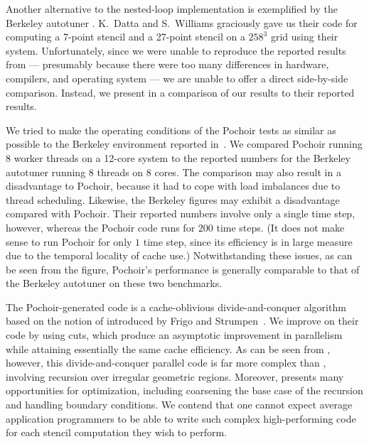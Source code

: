 Another alternative to the nested-loop implementation is exemplified
by the Berkeley autotuner \cite{Datta09,KamilShDa06,WilliamsCaOl08}.
K.~Datta and S.~Williams graciously gave us their code for computing a
7-point stencil and a 27-point stencil on a $258^3$ grid using their
system.  Unfortunately, since we were unable to reproduce the reported
results from \cite{Datta09} --- presumably because there were too many
differences in hardware, compilers, and operating system --- we are
unable to offer a direct side-by-side comparison.  Instead, we present
in  a comparison of our results to their reported
results.

We tried to make the operating conditions of the Pochoir tests as
similar as possible to the Berkeley environment reported
in~\cite{Datta09}.  We compared Pochoir running 8 worker threads on a
12-core system to the reported numbers for the Berkeley autotuner
running 8 threads on 8 cores.  The comparison may also result in a
disadvantage to Pochoir, because it had to cope with load imbalances
due to thread scheduling.  Likewise, the Berkeley figures may exhibit
a disadvantage compared with Pochoir.  Their reported numbers involve
only a single time step, however, whereas the Pochoir code runs for
$200$ time steps.  (It does not make sense to run Pochoir for only $1$
time step, since its efficiency is in large measure due to the
temporal locality of cache use.)  Notwithstanding these issues, as can
be seen from the figure, Pochoir's performance is generally comparable
to that of the Berkeley autotuner on these two benchmarks.

The Pochoir-generated  code is a cache-oblivious
\cite{FrigoLePr99,Prokop99} divide-and-conquer algorithm based on the
notion of  introduced by Frigo and
Strumpen~\cite{FrigoSt05, FrigoSt09}.  We improve on their code by
using  cuts, which produce an asymptotic improvement
in parallelism while attaining essentially the same cache efficiency.
As can be seen from , however, this
divide-and-conquer parallel code is far more complex than
, involving recursion over irregular geometric regions.
Moreover,  presents many opportunities for optimization,
including coarsening the base case of the recursion and handling
boundary conditions.  We contend that one cannot expect average
application programmers to be able to write such complex
high-performing code for each stencil computation they wish to
perform.

